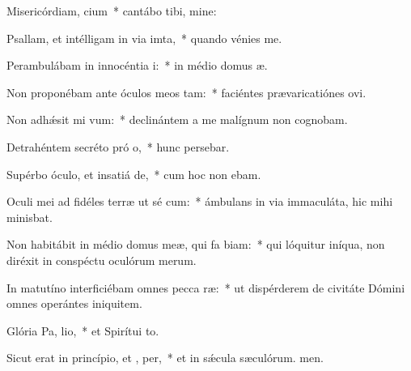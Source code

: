 \item Misericórdiam,  cium~* cantábo tibi, mine:
\item Psallam, et intélligam in via imta,~* quando vénies  me.
\item Perambulábam in innocéntia  i:~* in médio domus æ.
\item Non proponébam ante óculos meos  tam:~* faciéntes prævaricatiónes ovi.
\item Non adhǽsit mi  vum:~* declinántem a me malígnum non cognobam.
\item Detrahéntem secréto pró o,~* hunc persebar.
\item Supérbo óculo, et insatiá de,~* cum hoc non ebam.
\item Oculi mei ad fidéles terræ ut sé cum:~* ámbulans in via immaculáta, hic mihi minisbat.
\item Non habitábit in médio domus meæ, qui fa biam:~* qui lóquitur iníqua, non diréxit in conspéctu oculórum merum.
\item In matutíno interficiébam omnes pecca ræ:~* ut dispérderem de civitáte Dómini omnes operántes iniquitem.
\item Glória Pa,  lio,~* et Spirítui to.
\item Sicut erat in princípio, et ,  per,~* et in sǽcula sæculórum. men.
